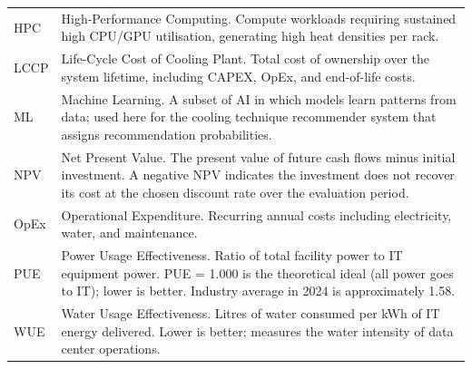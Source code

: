 ﻿\documentclass[12pt,a4paper]{report}
\begin{document}
\begin{longtable}{p{2.8cm}p{11.5cm}}
HPC & High-Performance Computing. Compute workloads requiring sustained high CPU/GPU
  utilisation, generating high heat densities per rack. \\[4pt]

LCCP & Life-Cycle Cost of Cooling Plant. Total cost of ownership over the system
  lifetime, including CAPEX, OpEx, and end-of-life costs. \\[4pt]

ML & Machine Learning. A subset of AI in which models learn patterns from data; used
  here for the cooling technique recommender system that assigns recommendation
  probabilities. \\[4pt]

NPV & Net Present Value. The present value of future cash flows minus initial
  investment. A negative NPV indicates the investment does not recover its cost
  at the chosen discount rate over the evaluation period. \\[4pt]

OpEx & Operational Expenditure. Recurring annual costs including electricity, water,
  and maintenance. \\[4pt]

PUE & Power Usage Effectiveness. Ratio of total facility power to IT equipment power.
  PUE = 1.000 is the theoretical ideal (all power goes to IT); lower is better.
  Industry average in 2024 is approximately 1.58. \\[4pt]

WUE & Water Usage Effectiveness. Litres of water consumed per kWh of IT energy
  delivered. Lower is better; measures the water intensity of data center operations. \\

\end{longtable}


% 
% 
\end{document}
